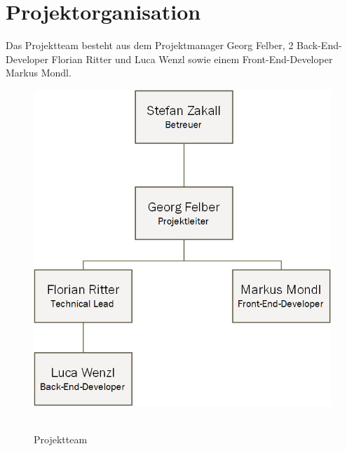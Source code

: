 \newpage
\section{Projektorganisation}
Das Projektteam besteht aus dem Projektmanager Georg Felber, 2 Back-End-Developer Florian Ritter und Luca Wenzl sowie einem Front-End-Developer Markus Mondl. 
\begin{figure}[H]
\centering
\includegraphics[width=.7\linewidth]{pictures/8.Projektorganisation/Projektteam.png}\
\caption{Projektteam}
\end{figure}
